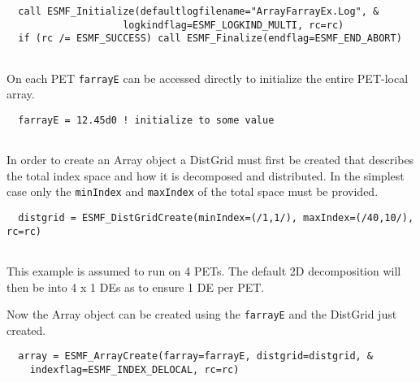 
 \begin{verbatim}
  call ESMF_Initialize(defaultlogfilename="ArrayFarrayEx.Log", &
                    logkindflag=ESMF_LOGKIND_MULTI, rc=rc)
  if (rc /= ESMF_SUCCESS) call ESMF_Finalize(endflag=ESMF_END_ABORT)
 
\end{verbatim}
 

   On each PET {\tt farrayE} can be accessed directly to initialize the entire
   PET-local array. 

 \begin{verbatim}
  farrayE = 12.45d0 ! initialize to some value
 
\end{verbatim}
 

   In order to create an Array object a DistGrid must first be created that 
   describes the total index space and how it is decomposed and distributed.
   In the simplest case only the {\tt minIndex} and {\tt maxIndex} of the 
   total space must be provided. 

 \begin{verbatim}
  distgrid = ESMF_DistGridCreate(minIndex=(/1,1/), maxIndex=(/40,10/), rc=rc)
 
\end{verbatim}
 

   This example is assumed to run on 4 PETs. The default 2D decomposition will 
   then be into 4 x 1 DEs as to ensure 1 DE per PET. 
   
   Now the Array object can be created using the {\tt farrayE} and the DistGrid
   just created. 

 \begin{verbatim}
  array = ESMF_ArrayCreate(farray=farrayE, distgrid=distgrid, &
    indexflag=ESMF_INDEX_DELOCAL, rc=rc)
 
\end{verbatim}
 

